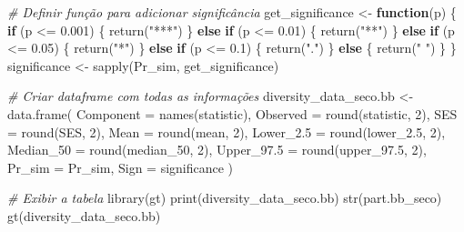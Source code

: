 \documentclass[
  letterpaper,
  DIV=11,
  numbers=noendperiod]{scrartcl}
\newenvironment{Shaded}{}{}
\newcommand{\AttributeTok}[1]{\textcolor[rgb]{0.49,0.56,0.16}{#1}}
\newcommand{\CommentTok}[1]{\textcolor[rgb]{0.38,0.63,0.69}{\textit{#1}}}
\newcommand{\ControlFlowTok}[1]{\textcolor[rgb]{0.00,0.44,0.13}{\textbf{#1}}}
\newcommand{\DecValTok}[1]{\textcolor[rgb]{0.25,0.63,0.44}{#1}}
\newcommand{\FloatTok}[1]{\textcolor[rgb]{0.25,0.63,0.44}{#1}}
\newcommand{\FunctionTok}[1]{\textcolor[rgb]{0.02,0.16,0.49}{#1}}
\newcommand{\NormalTok}[1]{#1}
\newcommand{\OtherTok}[1]{\textcolor[rgb]{0.00,0.44,0.13}{#1}}
\newcommand{\SpecialCharTok}[1]{\textcolor[rgb]{0.25,0.44,0.63}{#1}}
\newcommand{\StringTok}[1]{\textcolor[rgb]{0.25,0.44,0.63}{#1}}
\begin{document}
\begin{Shaded}
\begin{Highlighting}[numbers=left,,]
\CommentTok{\# Definir função para adicionar significância}
\NormalTok{get\_significance }\OtherTok{\textless{}{-}} \ControlFlowTok{function}\NormalTok{(p) \{}
  \ControlFlowTok{if}\NormalTok{ (p }\SpecialCharTok{\textless{}=} \FloatTok{0.001}\NormalTok{) \{}
    \FunctionTok{return}\NormalTok{(}\StringTok{"***"}\NormalTok{)}
\NormalTok{  \} }\ControlFlowTok{else} \ControlFlowTok{if}\NormalTok{ (p }\SpecialCharTok{\textless{}=} \FloatTok{0.01}\NormalTok{) \{}
    \FunctionTok{return}\NormalTok{(}\StringTok{"**"}\NormalTok{)}
\NormalTok{  \} }\ControlFlowTok{else} \ControlFlowTok{if}\NormalTok{ (p }\SpecialCharTok{\textless{}=} \FloatTok{0.05}\NormalTok{) \{}
    \FunctionTok{return}\NormalTok{(}\StringTok{"*"}\NormalTok{)}
\NormalTok{  \} }\ControlFlowTok{else} \ControlFlowTok{if}\NormalTok{ (p }\SpecialCharTok{\textless{}=} \FloatTok{0.1}\NormalTok{) \{}
    \FunctionTok{return}\NormalTok{(}\StringTok{"."}\NormalTok{)}
\NormalTok{  \} }\ControlFlowTok{else}\NormalTok{ \{}
    \FunctionTok{return}\NormalTok{(}\StringTok{" "}\NormalTok{)}
\NormalTok{  \}}
\NormalTok{\}}
\NormalTok{significance }\OtherTok{\textless{}{-}} \FunctionTok{sapply}\NormalTok{(Pr\_sim, get\_significance)}

\CommentTok{\# Criar dataframe com todas as informações}
\NormalTok{diversity\_data\_seco.bb }\OtherTok{\textless{}{-}} \FunctionTok{data.frame}\NormalTok{(}
  \AttributeTok{Component =} \FunctionTok{names}\NormalTok{(statistic),}
  \AttributeTok{Observed =} \FunctionTok{round}\NormalTok{(statistic, }\DecValTok{2}\NormalTok{),}
  \AttributeTok{SES =} \FunctionTok{round}\NormalTok{(SES, }\DecValTok{2}\NormalTok{),}
  \AttributeTok{Mean =} \FunctionTok{round}\NormalTok{(mean, }\DecValTok{2}\NormalTok{),}
  \AttributeTok{Lower\_2.5 =} \FunctionTok{round}\NormalTok{(lower\_2}\FloatTok{.5}\NormalTok{, }\DecValTok{2}\NormalTok{),}
  \AttributeTok{Median\_50 =} \FunctionTok{round}\NormalTok{(median\_50, }\DecValTok{2}\NormalTok{),}
  \AttributeTok{Upper\_97.5 =} \FunctionTok{round}\NormalTok{(upper\_97}\FloatTok{.5}\NormalTok{, }\DecValTok{2}\NormalTok{),}
  \AttributeTok{Pr\_sim =}\NormalTok{ Pr\_sim,}
  \AttributeTok{Sign =}\NormalTok{ significance}
\NormalTok{)}

\CommentTok{\# Exibir a tabela}
\FunctionTok{library}\NormalTok{(gt)}
\FunctionTok{print}\NormalTok{(diversity\_data\_seco.bb)}
\FunctionTok{str}\NormalTok{(part.bb\_seco)}
\FunctionTok{gt}\NormalTok{(diversity\_data\_seco.bb)}


\end{Highlighting}
\end{Shaded}
\end{document}
